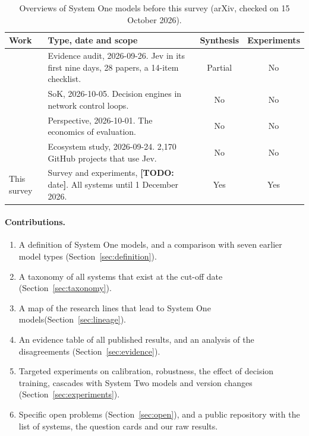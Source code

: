\documentclass[acmsmall,nonacm,screen]{acmart}
\newcommand{\todo}[1]{{\color{red}\textbf{[TODO: }#1\textbf{]}}}
\newcommand{\sones}{System One models\xspace}
\newcommand{\stwos}{System Two models\xspace}
\newcommand{\cutoffdate}{1 December 2026\xspace}
\begin{document}
\begin{table}[t]
  \caption{Overviews of \sones before this survey (arXiv, checked on 15 October 2026).}
  \label{tab:related-overviews}
  \footnotesize
  \begin{tabularx}{\linewidth}{@{}l>{\raggedright\arraybackslash}Xcc@{}}
    \toprule
    Work & Type, date and scope & Synthesis & Experiments \\
    \midrule
    \citet{tang2026typed} & Evidence audit, 2026-09-26. Jev in its first nine days, 28 papers, a 14-item checklist. & Partial & No \\
    \citet{li2026sok} & SoK, 2026-10-05. Decision engines in network control loops. & No & No \\
    \citet{hill2026judgement} & Perspective, 2026-10-01. The economics of evaluation. & No & No \\
    \citet{ling2026jev} & Ecosystem study, 2026-09-24. 2,170 GitHub projects that use Jev. & No & No \\
    This survey & Survey and experiments, \todo{date}. All systems until \cutoffdate. & Yes & Yes \\
    \bottomrule
  \end{tabularx}
\end{table}

\paragraph{Contributions.}
\begin{enumerate}
  \item A definition of \sones, and a comparison with seven earlier model types (Section~\ref{sec:definition}).
  \item A taxonomy of all systems that exist at the cut-off date (Section~\ref{sec:taxonomy}).
  \item A map of the research lines that lead to \sones (Section~\ref{sec:lineage}).
  \item An evidence table of all published results, and an analysis of the disagreements (Section~\ref{sec:evidence}).
  \item Targeted experiments on calibration, robustness, the effect of decision training, cascades with \stwos and version changes (Section~\ref{sec:experiments}).
  \item Specific open problems (Section~\ref{sec:open}), and a public repository with the list of systems, the question cards and our raw results.
\end{enumerate}
\end{document}
